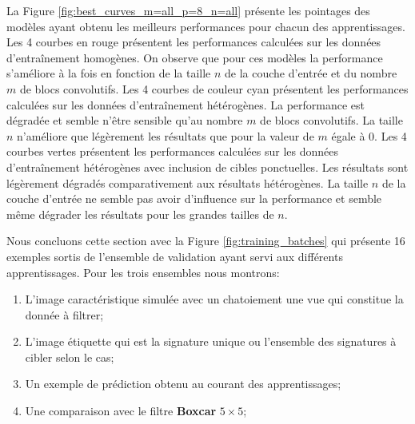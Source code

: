La Figure \ref{fig:best_curves_m=all_p=8_n=all} présente les pointages des modèles ayant obtenu les meilleurs performances pour chacun des apprentissages. Les 4 courbes en rouge présentent les performances calculées sur les données d'entraînement homogènes. On observe que pour ces modèles la performance s'améliore à la fois en fonction de la taille $n$ de la couche d'entrée et du nombre $m$ de blocs convolutifs. Les 4 courbes de couleur cyan présentent les performances calculées sur les données d'entraînement hétérogènes. La performance est dégradée et semble n'être sensible qu'au nombre $m$ de blocs convolutifs. La taille $n$ n'améliore que légèrement les résultats que pour la valeur de $m$ égale à 0. Les 4 courbes vertes présentent les performances calculées sur les données d'entraînement hétérogènes avec inclusion de cibles ponctuelles. Les résultats sont légèrement dégradés comparativement aux résultats hétérogènes. La taille $n$ de la couche d'entrée ne semble pas avoir d'influence sur la performance et semble même dégrader les résultats pour les grandes tailles de $n$.

Nous concluons cette section avec la Figure \ref{fig:training_batches} qui présente 16 exemples sortis de l'ensemble de validation ayant servi aux différents apprentissages. Pour les trois ensembles nous montrons:

\begin{enumerate}
    \item L'image caractéristique simulée avec un chatoiement une vue qui constitue la donnée à filtrer;
    \item L'image étiquette qui est la signature unique ou l'ensemble des signatures à cibler selon le cas;
    \item Un exemple de prédiction obtenu au courant des apprentissages;
    \item Une comparaison avec le filtre \textbf{Boxcar} $5\times5$;
\end{enumerate} 


